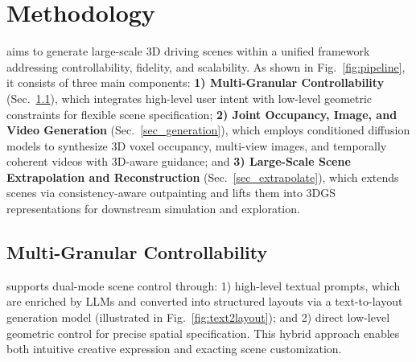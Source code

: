 \section{Methodology}

{\method} aims to generate large-scale 3D driving scenes within a unified framework addressing controllability, fidelity, and scalability.
As shown in Fig.~\ref{fig:pipeline}, it consists of three main components:
\textbf{1) Multi-Granular Controllability} (Sec.~\ref{sec_control}), which integrates high-level user intent with low-level geometric constraints for flexible scene specification;
\textbf{2) Joint Occupancy, Image, and Video Generation} (Sec.~\ref{sec_generation}), which employs conditioned diffusion models to synthesize 3D voxel occupancy, multi-view images, and temporally coherent videos with 3D-aware guidance; and
\textbf{3) Large-Scale Scene Extrapolation and Reconstruction} (Sec.~\ref{sec_extrapolate}), which extends scenes via consistency-aware outpainting and lifts them into 3DGS representations for downstream simulation and exploration.


\subsection{Multi-Granular Controllability}
\label{sec_control}
{\method} supports dual-mode scene control through: 1) high-level textual prompts, which are enriched by LLMs and converted into structured layouts via a text-to-layout generation model (illustrated in Fig.~\ref{fig:text2layout}); and 2) direct low-level geometric control for precise spatial specification.
This hybrid approach enables both intuitive creative expression and exacting scene customization.



